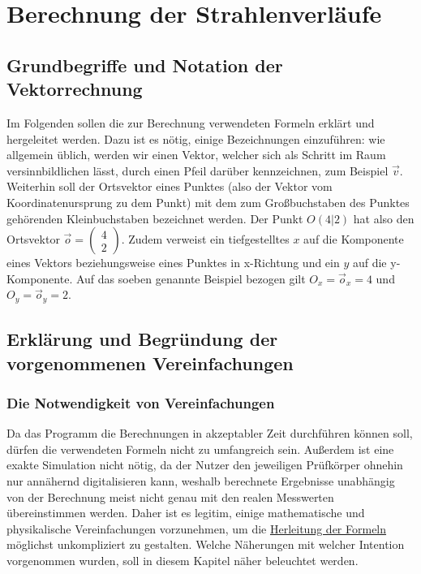 \documentclass[reducespace,stylepage,semiarbeit]{spezidoc}
\newcommand{\vect}[2]{\begin{pmatrix}#1\\#2\end{pmatrix}}
\begin{document}
\section{Berechnung der Strahlenverläufe}

\subsection{Grundbegriffe und Notation der Vektorrechnung}
Im Folgenden sollen die zur Berechnung verwendeten Formeln erklärt und hergeleitet werden. 
Dazu ist es nötig, einige Bezeichnungen einzuführen: wie allgemein üblich, werden wir einen Vektor, welcher sich als \glqq Schritt\grqq{} im Raum versinnbildlichen lässt, durch einen Pfeil darüber kennzeichnen, zum Beispiel $\vec{v}$. 
Weiterhin soll der Ortsvektor eines Punktes (also der Vektor vom Koordinatenursprung zu dem Punkt) mit dem zum Großbuchstaben des Punktes gehörenden Kleinbuchstaben bezeichnet werden. Der Punkt $O(4|2)$ hat also den Ortsvektor $\vec{o} = \vect{4}{2}$. 
Zudem verweist ein tiefgestelltes $x$ auf die Komponente eines Vektors beziehungsweise eines Punktes in x-Richtung und ein $y$ auf die y-Komponente. 
Auf das soeben genannte Beispiel bezogen gilt $O_x = \vec{o}_x = 4$ und $O_y = \vec{o}_y = 2$.

\subsection{Erklärung und Begründung der vorgenommenen Vereinfachungen}

\subsubsection{Die Notwendigkeit von Vereinfachungen} %
Da das Programm die Berechnungen in akzeptabler Zeit durchführen können soll, dürfen die verwendeten Formeln nicht zu umfangreich sein. 
Außerdem ist eine exakte Simulation nicht nötig, da der Nutzer den jeweiligen Prüfkörper ohnehin nur annähernd digitalisieren kann, weshalb berechnete Ergebnisse unabhängig von der Berechnung meist nicht genau mit den realen Messwerten übereinstimmen werden. 
Daher ist es legitim, einige mathematische und physikalische Vereinfachungen vorzunehmen, um die \hyperref[sec:herleitung]{Herleitung der Formeln} möglichst unkompliziert zu gestalten. 
Welche Näherungen mit welcher Intention vorgenommen wurden, soll in diesem Kapitel näher beleuchtet werden.
\end{document}
